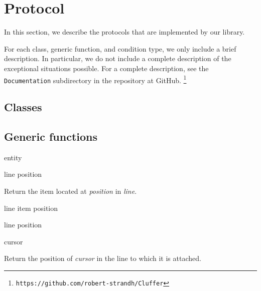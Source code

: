 \appendix

\section{Protocol}

In this section, we describe the protocols that are implemented by our
library.

For each class, generic function, and condition type, we only include
a brief description.  In particular, we do not include a complete
description of the exceptional situations possible.  For a complete
description, see the \texttt{Documentation} subdirectory in
the repository at GitHub.%
\footnote{\texttt{https://github.com/robert-strandh/Cluffer}}

\subsection{Classes}




\subsection{Generic functions}

 {entity}

 {line position}

Return the item located at \textit{position} in \textit{line}.

 {line item position}

 {line position}

 {cursor}

Return the position of \textit{cursor} in the line to which it is
attached.
